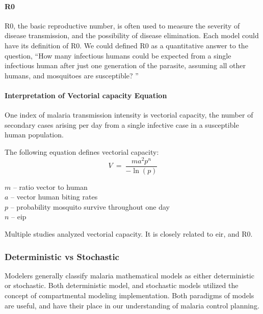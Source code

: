 \documentclass[a4paper, 12pt, twoside]{article}
\begin{document}
\paragraph{\texorpdfstring{\gls{R0}}{R0}}%
\label{par:R0}
\gls{R0}, the basic reproductive number, is often used to measure the severity of disease transmission, and the possibility of disease elimination.
Each model could have its definition of \gls{R0}.
We could defined \gls{R0} as a quantitative answer to the question, “How many infectious humans could be expected from a single infectious human after just one generation of the parasite, assuming all other humans, and mosquitoes are susceptible? ”

\paragraph{Interpretation of Vectorial capacity Equation}%
\label{par:interpretation_of_vectorial_capacity_equation}

One index of malaria transmission intensity is vectorial capacity, the number of secondary cases arising per day from a single infective case in a susceptible human population.

The following equation defines vectorial capacity:
\begin{equation}
	V\ =\ \frac{ma^2p^n}{-\ln{\left(p\right)}}
\end{equation}

\begin{centering}
	$m$ – ratio vector to human\\
	$a$ – vector human biting rates\\
	$p$	– probability mosquito survive throughout one day\\
	$n$	–	\gls{eip}
\end{centering}

Multiple studies\cite{LeMenach2007a,Bomblies2009b,Briet2019,AnjuViswan2019,Molineaux1978,Gerardin2017,Bomblies2014,Weaver2010a} analyzed vectorial capacity.
It is closely related to \gls{eir}, and \gls{R0}.

\subsubsection{Deterministic vs Stochastic}
\label{subsubsec:deterministic_vs_stochastic}

Modelers generally classify malaria mathematical models as either deterministic or stochastic.
Both deterministic model, and stochastic models utilized the concept of compartmental modeling implementation.
Both paradigms of models are useful, and have their place in our understanding of malaria control planning.
\end{document}
